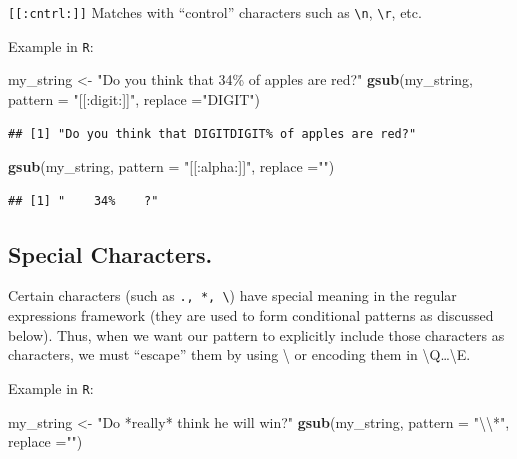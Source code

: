 \documentclass[
]{book}
\newenvironment{Shaded}{\begin{snugshade}}{\end{snugshade}}
\newcommand{\CharTok}[1]{\textcolor[rgb]{0.31,0.60,0.02}{#1}}
\newcommand{\DataTypeTok}[1]{\textcolor[rgb]{0.13,0.29,0.53}{#1}}
\newcommand{\KeywordTok}[1]{\textcolor[rgb]{0.13,0.29,0.53}{\textbf{#1}}}
\newcommand{\NormalTok}[1]{#1}
\newcommand{\StringTok}[1]{\textcolor[rgb]{0.31,0.60,0.02}{#1}}
\theoremstyle{definition}
\theoremstyle{definition}
\theoremstyle{definition}
\theoremstyle{remark}
\begin{document}
\texttt{{[}{[}:cntrl:{]}{]}} Matches with ``control'' characters such as \texttt{\textbackslash{}n}, \texttt{\textbackslash{}r}, etc.

Example in \texttt{R}:

\begin{Shaded}
\begin{Highlighting}[]
\NormalTok{my\_string <{-}}\StringTok{ "Do you think that 34\% of apples are red?"}
\KeywordTok{gsub}\NormalTok{(my\_string, }\DataTypeTok{pattern =} \StringTok{"[[:digit:]]"}\NormalTok{, }\DataTypeTok{replace =}\StringTok{"DIGIT"}\NormalTok{)}
\end{Highlighting}
\end{Shaded}

\begin{verbatim}
## [1] "Do you think that DIGITDIGIT% of apples are red?"
\end{verbatim}

\begin{Shaded}
\begin{Highlighting}[]
\KeywordTok{gsub}\NormalTok{(my\_string, }\DataTypeTok{pattern =} \StringTok{"[[:alpha:]]"}\NormalTok{, }\DataTypeTok{replace =}\StringTok{""}\NormalTok{)}
\end{Highlighting}
\end{Shaded}

\begin{verbatim}
## [1] "    34%    ?"
\end{verbatim}

\hypertarget{special-characters.}{%
\subsection{Special Characters.}\label{special-characters.}}

Certain characters (such as \texttt{.,\ *,\ \textbackslash{}}) have special meaning in the regular expressions framework (they are used to form conditional patterns as discussed below). Thus, when we want our pattern to explicitly include those characters as characters, we must ``escape'' them by using \textbackslash{} or encoding them in \textbackslash Q\ldots\textbackslash E.

Example in \texttt{R}:

\begin{Shaded}
\begin{Highlighting}[]
\NormalTok{my\_string <{-}}\StringTok{ "Do *really* think he will win?"}
\KeywordTok{gsub}\NormalTok{(my\_string, }\DataTypeTok{pattern =} \StringTok{"}\CharTok{\textbackslash{}\textbackslash{}}\StringTok{*"}\NormalTok{, }\DataTypeTok{replace =}\StringTok{""}\NormalTok{)}
\end{Highlighting}
\end{Shaded}
\end{document}
